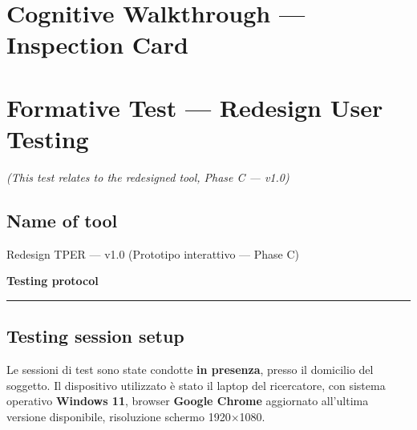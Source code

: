 ﻿\documentclass[11pt,a4paper]{article}
\begin{document}
\newpage

\section{Cognitive Walkthrough --- Inspection Card}
\label{sec:inspection-card}




\newpage

\section{Formative Test --- Redesign User Testing}
\textit{(This test relates to the redesigned tool, Phase C --- v1.0)}

\vspace{0.2cm}

\subsection*{Name of tool}
\begin{tcolorbox}[base]
Redesign TPER --- v1.0 (Prototipo interattivo --- Phase C)
\end{tcolorbox}

\vspace{0.2cm}

\begin{center}
  {\color{primaryColor}\large\bfseries Testing protocol}
  \vspace{0.1cm}
  \color{borderColor}\hrule
\end{center}

\vspace{0.2cm}

\subsection*{Testing session setup}
\begin{tcolorbox}[base]
Le sessioni di test sono state condotte \textbf{in presenza},
presso il domicilio del soggetto. Il dispositivo utilizzato è
stato il laptop del ricercatore, con sistema operativo
\textbf{Windows 11}, browser \textbf{Google Chrome} aggiornato
all'ultima versione disponibile, risoluzione schermo 1920$\times$1080.
\end{tcolorbox}
\end{document}
